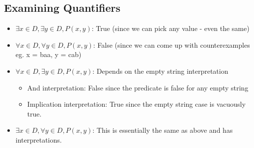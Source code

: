 \documentclass[12pt, letterpaper, twoside]{article}
\begin{document}
\subsection{Examining Quantifiers}
\begin{itemize}
	\item $\exists x \in D, \exists y \in D, P(x, y)$: True (since we can pick any value - even the same)
	\item $\forall x \in D, \forall y \in D, P(x, y)$: False (since we can come up with counterexamples eg. x = baa, y = cab)
	\item $\forall x \in D, \exists y \in D, P(x, y)$: Depends on the empty string interpretation
	\begin{itemize}
		\item And interpretation: False since the predicate is false for any empty string
		\item Implication interpretation: True since the empty string case is vacuously true.
	\end{itemize}
	\item $\exists x \in D, \forall y \in D, P(x, y)$: This is essentially the same as above and has interpretations.
\end{itemize}
\end{document}
